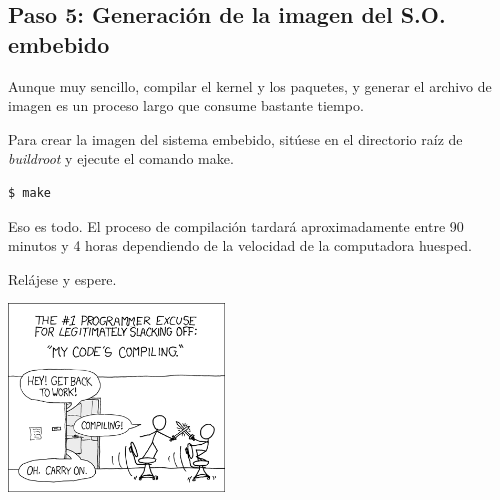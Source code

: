 %
%



\subsection{Paso 5: Generación de la imagen del S.O. embebido}%
\label{sec:step5}
Aunque muy sencillo, compilar el kernel y los paquetes, y generar el archivo de imagen es un proceso largo que consume bastante tiempo.

Para crear la imagen del sistema embebido, sitúese en el directorio raíz de \emph{buildroot} y ejecute el comando make.

\begin{Verbatim}[gobble=1]
	$ make
\end{Verbatim}

\noindent
Eso es todo.
El proceso de compilación tardará aproximadamente entre 90 minutos y 4 horas dependiendo de la velocidad de la computadora huesped.

\medskip{}
\noindent
Relájese y espere.

\begin{center}
	\includegraphics[width=0.8\columnwidth,height=5cm,keepaspectratio]{img/compiling.png}
\end{center}
